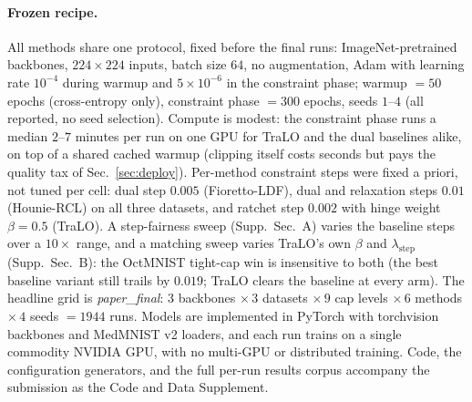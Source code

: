 \documentclass[letterpaper]{article} %
\begin{document}
\paragraph{Frozen recipe.}
All methods share one protocol, fixed before the final runs: ImageNet-pretrained
backbones, $224{\times}224$ inputs, batch size $64$, no augmentation, Adam with
learning rate $10^{-4}$ during warmup and $5{\times}10^{-6}$ in the constraint
phase; warmup $=50$ epochs (cross-entropy only), constraint phase $=300$ epochs,
seeds $1$--$4$ (all reported, no seed selection). Compute is modest: the constraint
phase runs a median $2$--$7$ minutes per run on one GPU for TraLO and the dual baselines
alike, on top of a shared cached warmup (clipping itself costs seconds but pays the
quality tax of Sec.~\ref{sec:deploy}). Per-method constraint steps were
fixed a priori, not tuned per cell: dual step $0.005$ (Fioretto-LDF), dual and
relaxation steps $0.01$ (Hounie-RCL) on all three datasets, and ratchet step $0.002$ with
hinge weight $\beta{=}0.5$ (TraLO). A step-fairness sweep (Supp.~Sec.~A) varies the
baseline steps over a $10\times$ range, and a matching sweep varies TraLO's own $\beta$ and
$\lambda_{\text{step}}$ (Supp.~Sec.~B): the OctMNIST tight-cap win is
insensitive to both (the best baseline variant still trails by $0.019$; TraLO clears the
baseline at every arm). The headline grid is
\emph{paper\_final}: $3$ backbones $\times\,3$ datasets $\times\,9$ cap levels
$\times\,6$ methods $\times\,4$ seeds $=1944$ runs. Models are implemented in PyTorch
with torchvision backbones and MedMNIST v2 loaders, and each run trains on a single
commodity NVIDIA GPU, with no multi-GPU or distributed training. Code, the configuration generators,
and the full per-run results corpus accompany the submission as the Code and Data
Supplement.
\end{document}
